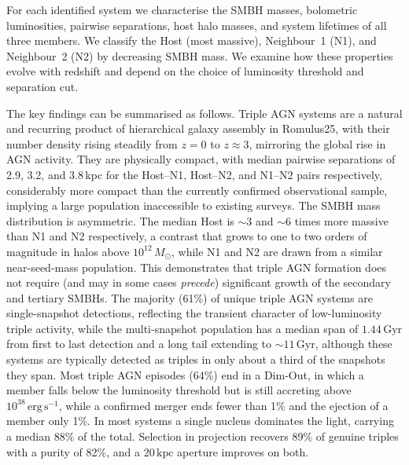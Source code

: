 \documentclass[twocolumn, 10pt]{article}
\begin{document}
For each identified system we characterise the SMBH masses, bolometric luminosities, pairwise separations, host halo masses, and system lifetimes of all three members. We classify the Host (most massive), Neighbour~1 (N1), and Neighbour~2 (N2) by decreasing SMBH mass. We examine how these properties evolve with redshift and depend on the choice of luminosity threshold and separation cut.

The key findings can be summarised as follows. Triple AGN systems are a natural and recurring product of hierarchical galaxy assembly in Romulus25, with their number density rising steadily from $z = 0$ to $z \approx 3$, mirroring the global rise in AGN activity. They are physically compact, with median pairwise separations of 2.9, 3.2, and 3.8\,kpc for the Host--N1, Host--N2, and N1--N2 pairs respectively, considerably more compact than the currently confirmed observational sample, implying a large population inaccessible to existing surveys. The SMBH mass distribution is asymmetric. The median Host is $\sim 3$ and $\sim 6$ times more massive than N1 and N2 respectively, a contrast that grows to one to two orders of magnitude in halos above $10^{12}\,M_\odot$, while N1 and N2 are drawn from a similar near-seed-mass population. This demonstrates that triple AGN formation does not require (and may in some cases \textit{precede}) significant growth of the secondary and tertiary SMBHs. The majority (61\%) of unique triple AGN systems are single-snapshot detections, reflecting the transient character of low-luminosity triple activity, while the multi-snapshot population has a median span of $1.44\,\mathrm{Gyr}$ from first to last detection and a long tail extending to $\sim 11\,\mathrm{Gyr}$, although these systems are typically detected as triples in only about a third of the snapshots they span. Most triple AGN episodes (64\%) end in a Dim-Out, in which a member falls below the luminosity threshold but is still accreting above $10^{38}\,\mathrm{erg\,s^{-1}}$, while a confirmed merger ends fewer than 1\% and the ejection of a member only 1\%. In most systems a single nucleus dominates the light, carrying a median 88\% of the total. Selection in projection recovers 89\% of genuine triples with a purity of 82\%, and a $20\,\mathrm{kpc}$ aperture improves on both.
\end{document}
